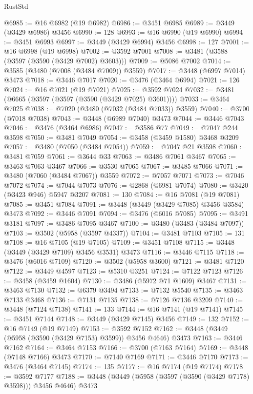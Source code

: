\begin{lexlean}{RustStd}
\begin{coremodule}
{\begin{coremodule}
{{{{{{{{{{{{{{{{{{{{{{{{{{{{{{{{{{{{{{{{{{{{{{{{{{{{{{{{{{{{{{{{{{{{{{{{{{{{{{{{{{{{{@6985 := @16 @6982 (@19 @6982)
@6986 := @3451 @6985
@6989 := @3449 (@3429 @6986) @3456
@6990 := 128
@6993 := @16 @6990 (@19 @6990)
@6994 := @3451 @6993
@6997 := @3449 (@3429 @6994) @3456
@6998 := 127
@7001 := @16 @6998 (@19 @6998)
@7002 := @3592 @7001
@7008 := @3481 (@3588 (@3597 (@3590 (@3429 @7002) @3603)))
@7009 := @5086 @7002
@7014 := @3585 (@3480 (@7008 (@3484 @7009)) @3559)
@7017 := @3448 (@6997 @7014) @3473
@7018 := @3446 @7017
@7020 := @3476 (@3464 @6994)
@7021 := 126
@7024 := @16 @7021 (@19 @7021)
@7025 := @3592 @7024
@7032 := @3481 (@6665 (@3597 (@3597 (@3590 (@3429 @7025) @3601))))
@7033 := @3464 @7025
@7038 := @7020 (@3480 (@7032 (@3484 @7033)) @3559)
@7040 := @3700 (@7018 @7038)
@7043 := @3448 (@6989 @7040) @3473
@7044 := @3446 @7043
@7046 := @3476 (@3464 @6986)
@7047 := @3586 @77
@7049 := @7047 @244 @3598
@7050 := @3481 @7049
@7054 := @3458 (@3459 @1580) @3468 @3209
@7057 := @3480 (@7050 (@3484 @7054))
@7059 := @7047 @21 @3598
@7060 := @3481 @7059
@7061 := @3644 @33
@7063 := @3486 @7061 @3467
@7065 := @3463 @7063 @3467
@7066 := @3530 @7065
@7067 := @3485 @7066
@7071 := @3480 (@7060 (@3484 @7067)) @3559
@7072 := @7057 @7071
@7073 := @7046 @7072
@7074 := @7044 @7073
@7076 := @2868 (@6981 @7074)
@7080 := @3420 (@3423 @946) @5947 @3207
@7081 := 130
@7084 := @16 @7081 (@19 @7081)
@7085 := @3451 @7084
@7091 := @3448 (@3449 (@3429 @7085) @3456 @3584) @3473
@7092 := @3446 @7091
@7094 := @3476 (@6016 @7085)
@7095 := @3491 @3181
@7097 := @3486 @7095 @3467
@7100 := @3480 (@3483 (@3484 @7097))
@7103 := @3502 (@5958 (@3597 @4337))
@7104 := @3481 @7103
@7105 := 131
@7108 := @16 @7105 (@19 @7105)
@7109 := @3451 @7108
@7115 := @3448 (@3449 (@3429 @7109) @3456 @3531) @3473
@7116 := @3446 @7115
@7118 := @3476 (@6016 @7109)
@7120 := @3502 (@5958 @3600)
@7121 := @3481 @7120
@7122 := @3449 @4597
@7123 := @5310 @3251
@7124 := @7122 @7123
@7126 := @3458 (@3459 @1604)
@7130 := @3486 (@5972 @71 @1609) @3467
@7131 := @3463 @7130
@7132 := @6379 @3494
@7133 := @7132 @5540
@7135 := @3463 @7133 @3468
@7136 := @7131 @7135
@7138 := @7126 @7136 @3209
@7140 := @3448 (@7124 @7138)
@7141 := 133
@7144 := @16 @7141 (@19 @7141)
@7145 := @3451 @7144
@7148 := @3449 (@3429 @7145) @3456
@7149 := 132
@7152 := @16 @7149 (@19 @7149)
@7153 := @3592 @7152
@7162 := @3448 (@3449 (@5958 (@3590 (@3429 @7153) @3599)) @3456 @4646) @3473
@7163 := @3446 @7162
@7164 := @3464 @7153
@7166 := @3700 (@7163 @7164)
@7169 := @3448 (@7148 @7166) @3473
@7170 := @7140 @7169
@7171 := @3446 @7170
@7173 := @3476 (@3464 @7145)
@7174 := 135
@7177 := @16 @7174 (@19 @7174)
@7178 := @3592 @7177
@7188 := @3448 (@3449 (@5958 (@3597 (@3590 (@3429 @7178) @3598))) @3456 @4646) @3473
}}}}}}}}}}}}}}}}}}}}}}}}}}}}}}}}}}}}}}}}}}}}}}}}}}}}}}}}}}}}}}}}}}}}}}}}}}}}}}}}}}}}}
\end{coremodule}}
\end{coremodule}
\end{lexlean}
